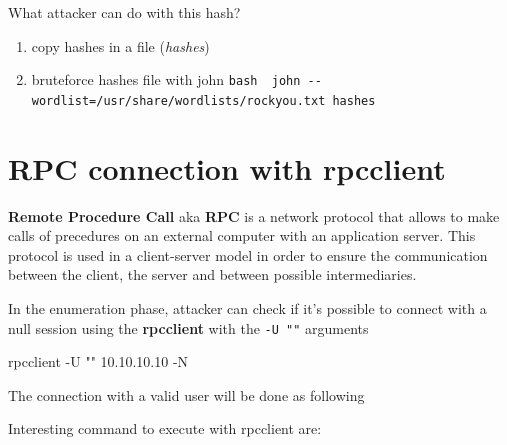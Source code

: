 \documentclass{assets/ipesethesis}
\newenvironment{Shaded}{\begin{snugshade}}{\end{snugshade}}
\newcommand{\CommentTok}[1]{\textcolor[rgb]{0.56,0.35,0.01}{\textit{#1}}}
\newcommand{\ExtensionTok}[1]{#1}
\newcommand{\NormalTok}[1]{#1}
\newcommand{\OperatorTok}[1]{\textcolor[rgb]{0.81,0.36,0.00}{\textbf{#1}}}
\newcommand{\StringTok}[1]{\textcolor[rgb]{0.31,0.60,0.02}{#1}}
\providecommand{\tightlist}{%
  \setlength{\itemsep}{0pt}\setlength{\parskip}{0pt}}
\begin{document}
What attacker can do with this hash?

\begin{enumerate}
\def\labelenumi{\arabic{enumi}.}
\tightlist
\item
  copy hashes in a file (\emph{hashes})
\item
  bruteforce hashes file with john
  \texttt{bash\ \ john\ -\/-wordlist=/usr/share/wordlists/rockyou.txt\ hashes}
\end{enumerate}

\hypertarget{rpc-connection-with-rpcclient}{%
\section*{RPC connection with rpcclient}\label{rpc-connection-with-rpcclient}}

\textbf{Remote Procedure Call} aka \textbf{RPC} is a network protocol that allows to make calls of precedures on an external computer with an
application server. This protocol is used in a client-server model in order to ensure the communication between the client, the server and
between possible intermediaries.

In the enumeration phase, attacker can check if it's possible to connect with a null session using the \textbf{rpcclient} with the \texttt{-U\ ""} arguments

\begin{Shaded}
\begin{Highlighting}[]
\ExtensionTok{rpcclient}\NormalTok{ -U }\StringTok{""}\NormalTok{ 10.10.10.10 -N}
\end{Highlighting}
\end{Shaded}

The connection with a valid user will be done as following

\begin{Shaded}
\end{Shaded}

Interesting command to execute with rpcclient are:

\begin{Shaded}
\end{Shaded}
\end{document}
